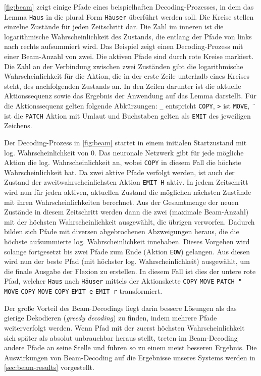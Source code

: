 \documentclass[a4paper]{article}
\newcommand{\action}[1]{\texttt{#1}}
\begin{document}
\autoref{fig:beam} zeigt einige Pfade eines beispielhaften Decoding-Prozesses, in dem das Lemma \texttt{Haus} in die plural Form \texttt{Häuser} überführt werden soll.
Die Kreise stellen einzelne Zustände für jeden Zeitschritt dar.
Die Zahl im inneren ist die logarithmische Wahrscheinlichkeit des Zustands, die entlang der Pfade von links nach rechts aufsummiert wird.
Das Beispiel zeigt einen Decoding-Prozess mit einer Beam-Anzahl von zwei.
Die aktiven Pfade sind durch rote Kreise markiert.
Die Zahl an der Verbindung zwischen zwei Zuständen gibt die logarithmische Wahrscheinlichkeit für die Aktion, die in der erste Zeile unterhalb eines Kreises steht, des nachfolgenden Zustands an.
In den Zeilen darunter ist die aktuelle Aktionssequenz sowie das Ergebnis der Anwendung auf das Lemma darstellt.
Für die Aktionssequenz gelten folgende Abkürzungen: \texttt{\_} entspricht \action{COPY}, \texttt{>} ist \action{MOVE}, \texttt{\"} ist die \action{PATCH} Aktion mit Umlaut und Buchstaben gelten als \action{EMIT} des jeweiligen Zeichens.

Der Decoding-Prozess in \autoref{fig:beam} startet in einem initialen Startzustand mit log. Wahrscheinlichkeit von $0$.
Das neuronale Netzwerk gibt für jede mögliche Aktion die log. Wahrscheinlichkeit an, wobei \action{COPY} in diesem Fall die höchste Wahrscheinlichkeit hat.
Da zwei aktive Pfade verfolgt werden, ist auch der Zustand der zweitwahrscheinlichsten Aktion \action{EMIT H} aktiv.
In jedem Zeitschritt wird nun für jeden aktiven, aktuellen Zustand die möglichen nächsten Zustände mit ihren Wahrscheinlichkeiten berechnet.
Aus der Gesamtmenge der neuen Zustände in diesem Zeitschritt werden dann die zwei (maximale Beam-Anzahl) mit der höchsten Wahrscheinlichkeit ausgewählt, die übrigen verworfen.
Dadurch bilden sich Pfade mit diversen abgebrochenen Abzweigungen heraus, die die höchste aufsummierte log. Wahrscheinlichkeit innehaben.
Dieses Vorgehen wird solange fortgesetzt bis zwei Pfade zum Ende (Aktion \action{EOW}) gelangen.
Aus diesen wird nun der beste Pfad (mit höchster log. Wahrscheinlichkeit) ausgewählt, um die finale Ausgabe der Flexion zu erstellen.
In diesem Fall ist dies der untere rote Pfad, welcher \texttt{Haus} nach \texttt{Häuser} mittels der Aktionskette \action{COPY} \action{MOVE} \action{PATCH "} \action{MOVE} \action{COPY} \action{MOVE} \action{COPY} \action{EMIT e} \action{EMIT r} transformiert.

Der große Vorteil des Beam-Decodings liegt darin bessere Lösungen als das gierige Dekodieren (\textit{greedy decoding}) zu finden, indem mehrere Pfade weiterverfolgt werden.
Wenn Pfad mit der zuerst höchsten Wahrscheinlichkeit sich später als absolut unbrauchbar heraus stellt, treten im Beam-Decoding andere Pfade an seine Stelle und führen so zu einem meist besseren Ergebnis.
Die Auswirkungen von Beam-Decoding auf die Ergebnisse unseres Systems werden in \autoref{sec:beam-results} vorgestellt.
\end{document}
